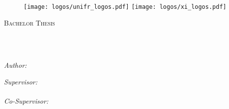 

\begin{titlepage}
\begin{center}


\begin{figure}
  \centering
    \texttt{[image: logos/unifr\_logos.pdf]}
  \hfill
    \texttt{[image: logos/xi\_logos.pdf]}
  \vspace{30mm}
\end{figure}

{\scshape\LARGE \univname\par}\vspace{1.5cm} %
\textsc{\Large Bachelor Thesis}\\[0.5cm] %
\HRule \\[0.4cm] %
{\huge \bfseries \ttitle\par}\vspace{0.4cm} %
\HRule \\[1.5cm] %

\begin{minipage}[t]{0.4\textwidth}
\begin{flushleft} \large
\emph{Author:}\\
\href{mailto://david.bucher@unifr.ch}{\authorname} %
\end{flushleft}
\end{minipage}
\begin{minipage}[t]{0.4\textwidth}
\begin{flushright} \large
\emph{Supervisor:} \\
\href{https://exascale.info/phil}{\supname} %
\\\vspace*{1ex}\emph{Co-Supervisor:} \\ %
\href{https://exascale.info/members/}{\cosupname} %
\end{flushright}
\end{minipage}\\[1cm]


\end{center}
\end{titlepage}
